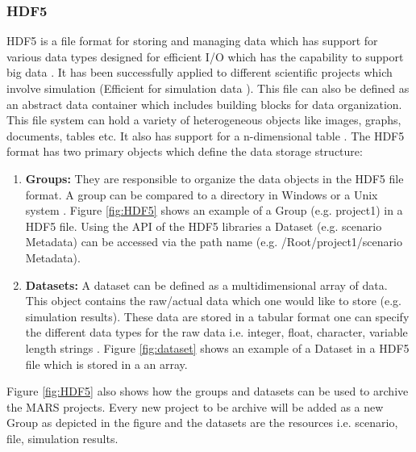 \subsubsection{HDF5}
HDF5 is a file format for storing and managing data which has support for various data types designed for
efficient I/O which has the capability to support big data \cite{HDF5}. It has been successfully applied to different scientific projects which
involve simulation (Efficient
for simulation data \cite[p.~11]{Savic2007}). This file can also be defined as an abstract data container which includes building blocks for data organization. 
This file system can hold a variety of heterogeneous objects like images, graphs, documents, tables etc. It also has support for a n-dimensional table  \cite[p.~2]{HDF5}. 
The HDF5 format has two primary objects which define the data storage structure:
\begin{enumerate}
    \item \textbf{Groups:}  They are responsible to organize the data objects in the HDF5 file format. A group can be compared to a directory 
    in Windows or a Unix system \cite{HDF5}. Figure \ref{fig:HDF5} shows an example of a Group (e.g. project1) in a HDF5 file. Using the API of the HDF5 libraries a Dataset 
    (e.g. scenario Metadata) can be accessed via the path name (e.g. /Root/project1/scenario Metadata).
    \item \textbf{Datasets:} A dataset can be defined as a multidimensional array of data. This object contains the raw/actual data which one would like to store (e.g. simulation results).
    These data are stored in a tabular format 
    one can specify the different data types for the raw data i.e. integer, float, character, variable length strings \cite{HDF5}. Figure \ref{fig:dataset} shows
    an example of a Dataset in a HDF5 file which is stored in a an array.
\end{enumerate}

Figure \ref{fig:HDF5} also shows how the groups and datasets can be used to archive the MARS projects. Every new project to be archive will be added as a new Group
as depicted in the figure and the datasets are the resources i.e. scenario, file, simulation results. 

